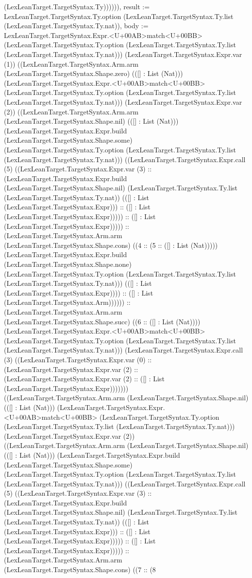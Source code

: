 \documentclass[11pt]{article}
\begin{document}
(LexLeanTarget.TargetSyntax.Ty)))))), result := LexLeanTarget.TargetSyntax.Ty.option (LexLeanTarget.TargetSyntax.Ty.list (LexLeanTarget.TargetSyntax.Ty.nat)), body := LexLeanTarget.TargetSyntax.Expr.<U+00AB>match<U+00BB> (LexLeanTarget.TargetSyntax.Ty.option (LexLeanTarget.TargetSyntax.Ty.list (LexLeanTarget.TargetSyntax.Ty.nat))) (LexLeanTarget.TargetSyntax.Expr.var (1)) ((LexLeanTarget.TargetSyntax.Arm.arm (LexLeanTarget.TargetSyntax.Shape.zero) (([] : List (Nat))) (LexLeanTarget.TargetSyntax.Expr.<U+00AB>match<U+00BB> (LexLeanTarget.TargetSyntax.Ty.option (LexLeanTarget.TargetSyntax.Ty.list (LexLeanTarget.TargetSyntax.Ty.nat))) (LexLeanTarget.TargetSyntax.Expr.var (2)) ((LexLeanTarget.TargetSyntax.Arm.arm (LexLeanTarget.TargetSyntax.Shape.nil) (([] : List (Nat))) (LexLeanTarget.TargetSyntax.Expr.build (LexLeanTarget.TargetSyntax.Shape.some) (LexLeanTarget.TargetSyntax.Ty.option (LexLeanTarget.TargetSyntax.Ty.list (LexLeanTarget.TargetSyntax.Ty.nat))) ((LexLeanTarget.TargetSyntax.Expr.call (5) ((LexLeanTarget.TargetSyntax.Expr.var (3) :: (LexLeanTarget.TargetSyntax.Expr.build (LexLeanTarget.TargetSyntax.Shape.nil) (LexLeanTarget.TargetSyntax.Ty.list (LexLeanTarget.TargetSyntax.Ty.nat)) (([] : List (LexLeanTarget.TargetSyntax.Expr))) :: ([] : List (LexLeanTarget.TargetSyntax.Expr))))) :: ([] : List (LexLeanTarget.TargetSyntax.Expr))))) :: (LexLeanTarget.TargetSyntax.Arm.arm (LexLeanTarget.TargetSyntax.Shape.cons) ((4 :: (5 :: ([] : List (Nat))))) (LexLeanTarget.TargetSyntax.Expr.build (LexLeanTarget.TargetSyntax.Shape.none) (LexLeanTarget.TargetSyntax.Ty.option (LexLeanTarget.TargetSyntax.Ty.list (LexLeanTarget.TargetSyntax.Ty.nat))) (([] : List (LexLeanTarget.TargetSyntax.Expr)))) :: ([] : List (LexLeanTarget.TargetSyntax.Arm)))))) :: (LexLeanTarget.TargetSyntax.Arm.arm (LexLeanTarget.TargetSyntax.Shape.succ) ((6 :: ([] : List (Nat)))) (LexLeanTarget.TargetSyntax.Expr.<U+00AB>match<U+00BB> (LexLeanTarget.TargetSyntax.Ty.option (LexLeanTarget.TargetSyntax.Ty.list (LexLeanTarget.TargetSyntax.Ty.nat))) (LexLeanTarget.TargetSyntax.Expr.call (3) ((LexLeanTarget.TargetSyntax.Expr.var (0) :: (LexLeanTarget.TargetSyntax.Expr.var (2) :: (LexLeanTarget.TargetSyntax.Expr.var (2) :: ([] : List (LexLeanTarget.TargetSyntax.Expr))))))) ((LexLeanTarget.TargetSyntax.Arm.arm (LexLeanTarget.TargetSyntax.Shape.nil) (([] : List (Nat))) (LexLeanTarget.TargetSyntax.Expr.<U+00AB>match<U+00BB> (LexLeanTarget.TargetSyntax.Ty.option (LexLeanTarget.TargetSyntax.Ty.list (LexLeanTarget.TargetSyntax.Ty.nat))) (LexLeanTarget.TargetSyntax.Expr.var (2)) ((LexLeanTarget.TargetSyntax.Arm.arm (LexLeanTarget.TargetSyntax.Shape.nil) (([] : List (Nat))) (LexLeanTarget.TargetSyntax.Expr.build (LexLeanTarget.TargetSyntax.Shape.some) (LexLeanTarget.TargetSyntax.Ty.option (LexLeanTarget.TargetSyntax.Ty.list (LexLeanTarget.TargetSyntax.Ty.nat))) ((LexLeanTarget.TargetSyntax.Expr.call (5) ((LexLeanTarget.TargetSyntax.Expr.var (3) :: (LexLeanTarget.TargetSyntax.Expr.build (LexLeanTarget.TargetSyntax.Shape.nil) (LexLeanTarget.TargetSyntax.Ty.list (LexLeanTarget.TargetSyntax.Ty.nat)) (([] : List (LexLeanTarget.TargetSyntax.Expr))) :: ([] : List (LexLeanTarget.TargetSyntax.Expr))))) :: ([] : List (LexLeanTarget.TargetSyntax.Expr))))) :: (LexLeanTarget.TargetSyntax.Arm.arm (LexLeanTarget.TargetSyntax.Shape.cons) ((7 :: (8 
\end{document}

